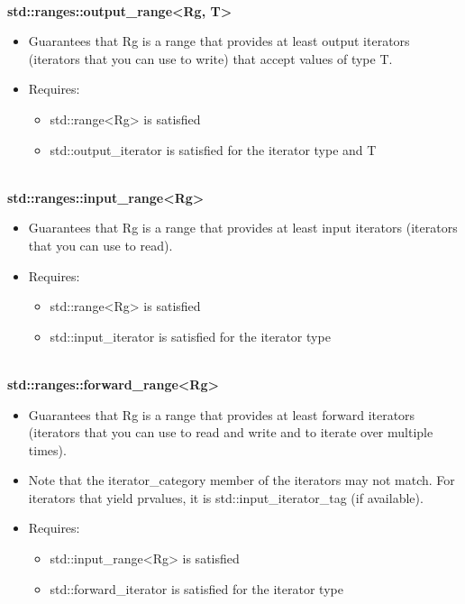\noindent
\hspace*{\fill} \\ %
\textbf{std::ranges::output\_range<Rg, T>}

\begin{itemize}
\item
Guarantees that Rg is a range that provides at least output iterators (iterators that you can use to write) that accept values of type T.

\item
Requires:

\begin{itemize}
\item
std::range<Rg> is satisfied

\item
std::output\_iterator is satisfied for the iterator type and T
\end{itemize}
\end{itemize}


\noindent
\hspace*{\fill} \\ %
\textbf{std::ranges::input\_range<Rg>}

\begin{itemize}
\item
Guarantees that Rg is a range that provides at least input iterators (iterators that you can use to read).

\item
Requires:

\begin{itemize}
\item
std::range<Rg> is satisfied

\item
std::input\_iterator is satisfied for the iterator type
\end{itemize}
\end{itemize}

\noindent
\hspace*{\fill} \\ %
\textbf{std::ranges::forward\_range<Rg>}

\begin{itemize}
\item
Guarantees that Rg is a range that provides at least forward iterators (iterators that you can use to read and write and to iterate over multiple times).

\item
Note that the iterator\_category member of the iterators may not match. For iterators that yield prvalues, it is std::input\_iterator\_tag (if available).

\item
Requires:

\begin{itemize}
\item
std::input\_range<Rg> is satisfied

\item
std::forward\_iterator is satisfied for the iterator type
\end{itemize}
\end{itemize}

